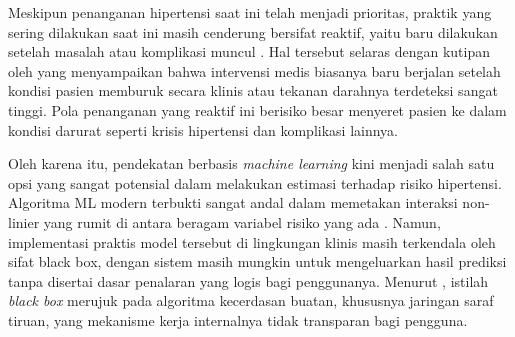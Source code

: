 Meskipun penanganan hipertensi saat ini telah menjadi prioritas, praktik yang sering dilakukan saat ini masih cenderung bersifat reaktif, yaitu baru dilakukan setelah masalah atau komplikasi muncul \autocite{Whelton2018Guideline}. Hal tersebut selaras dengan kutipan oleh \textcite{Haddadin2018Hypertensive} yang menyampaikan bahwa intervensi medis biasanya baru berjalan setelah kondisi pasien memburuk secara klinis atau tekanan darahnya terdeteksi sangat tinggi. Pola penanganan yang reaktif ini berisiko besar menyeret pasien ke dalam kondisi darurat seperti krisis hipertensi dan komplikasi lainnya.

Oleh karena itu, pendekatan berbasis \textit{machine learning} kini menjadi salah satu opsi yang sangat potensial dalam melakukan estimasi terhadap risiko hipertensi. Algoritma ML modern terbukti sangat andal dalam memetakan interaksi non-linier yang rumit di antara beragam variabel risiko yang ada \autocite{Tarimana2024}. Namun, implementasi praktis model tersebut di lingkungan klinis masih terkendala oleh sifat black box, dengan sistem masih mungkin untuk mengeluarkan hasil prediksi tanpa disertai dasar penalaran yang logis bagi penggunanya. Menurut \textcite{amann2022explain}, istilah \textit{black box} merujuk pada algoritma kecerdasan buatan, khususnya jaringan saraf tiruan, yang mekanisme kerja internalnya tidak transparan bagi pengguna.



